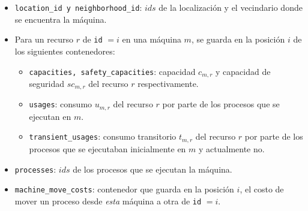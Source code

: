 \documentclass[../informe2.tex]{subfiles}
\begin{document}
\noindent\begin{minipage}{0.4\textwidth}
\end{minipage}\hfill
\begin{minipage}{0.55\textwidth}
	\small
	\begin{itemize}[leftmargin=*]
		\item \texttt{location\_id y neighborhood\_id}: $ids$ de la localización y el vecindario donde se encuentra la máquina.
		\item Para un recurso $r$ de \texttt{id}  $=i$ en una máquina $m$, se guarda en la posición $i$ de los siguientes contenedores:
		\begin{itemize}
			\item \texttt{capacities, safety\_capacities}: capacidad $c_{m,r}$ y capacidad de seguridad $sc_{m,r}$ del recurso $r$ respectivamente.
			\item \texttt{usages}: consumo $u_{m,r}$ del recurso $r$ por parte de los procesos que se ejecutan en $m$.
			\item \texttt{transient\_usages}: consumo transitorio $t_{m,r}$ del recurso $r$ por parte de los procesos que se ejecutaban inicialmente en $m$ y actualmente no.
		\end{itemize}
		\item \texttt{processes}: $ids$ de los procesos que se ejecutan la máquina.
		\item \texttt{machine\_move\_costs}: contenedor que guarda en la posición $i$, el costo de mover un proceso desde \textit{esta} máquina a otra de \texttt{id} $=i$.
	\end{itemize}
\end{minipage}

\vspace{1cm}
\end{document}
